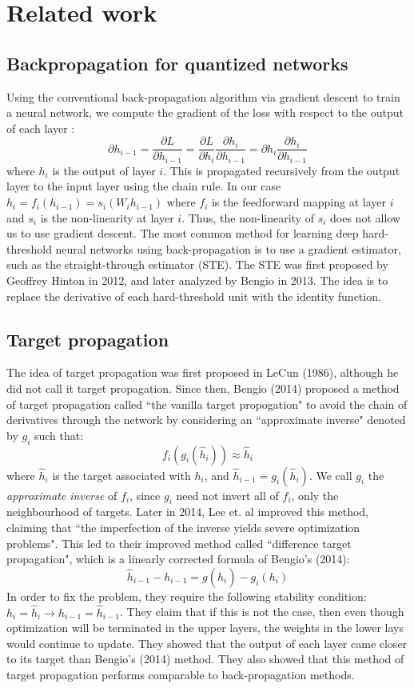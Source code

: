 \documentclass[a4paper]{article}
\begin{document}
\section{Related work}
\label{S:2}

\subsection{Backpropagation for quantized networks}

Using the conventional back-propagation algorithm via gradient descent to train a neural network, we compute the gradient of the loss with respect to the output of each layer : $$\partial h_{i-1}=\frac{\partial L}{\partial h_{i-1}}=\frac{\partial L}{\partial h_i}\frac{\partial h_i}{\partial h_{i-1}}=\partial h_i \frac{\partial h_i}{\partial h_{i-1}}$$ where $h_i$ is the output of layer $i$. This is propagated recursively from the output layer to the input layer using the chain rule. In our case $h_i=f_i(h_{i-1})=s_i(W_ih_{i-1})$ where $f_i$ is the feedforward mapping at layer $i$ and $s_i$ is the non-linearity at layer $i$. Thus, the non-linearity of $s_i$ does not allow us to use gradient descent. The most common method for learning deep hard-threshold neural networks using back-propagation is to use a gradient estimator, such as the straight-through estimator (STE). The STE was first proposed by Geoffrey Hinton in 2012, and later analyzed by Bengio in 2013. The idea is to replace the derivative of each hard-threshold unit with the identity function.\\

\subsection{Target propagation}

The idea of target propagation was first proposed in LeCun (1986), although he did not call it target propagation. Since then, Bengio (2014) proposed a method of target propagation called ``the vanilla target propogation" to avoid the chain of derivatives through the network by considering an ``approximate inverse" denoted by $g_i$ such that: $$f_i(g_i(\hat{h}_i)) \approx \hat{h}_i$$ where $\hat{h}_i$ is the target associated with $h_i$, and $\hat{h}_{i-1}=g_i(\hat{h}_i)$. We call $g_i$ the \emph{approximate inverse} of $f_i$, since $g_i$ need not invert all of $f_i$, only the neighbourhood of targets. Later in 2014, Lee et. al improved this method, claiming that ``the imperfection of the inverse yields severe optimization problems". This led to their improved method called ``difference target propagation", which is a linearly corrected formula of Bengio's (2014): $$\hat{h}_{i-1}-h_{i-1}=g(\hat{h}_i)-g_i(h_i)$$ In order to fix the problem, they require the following stability condition: $h_i = \hat{h}_i \rightarrow h_{i-1}=\hat{h}_{i-1}$. They claim that if this is not the case, then even though optimization will be terminated in the upper layers, the weights in the lower lays would continue to update. They showed that the output of each layer came closer to its target than Bengio's (2014) method. They also showed that this method of target propagation performs comparable to back-propagation methods. \\
\end{document}
